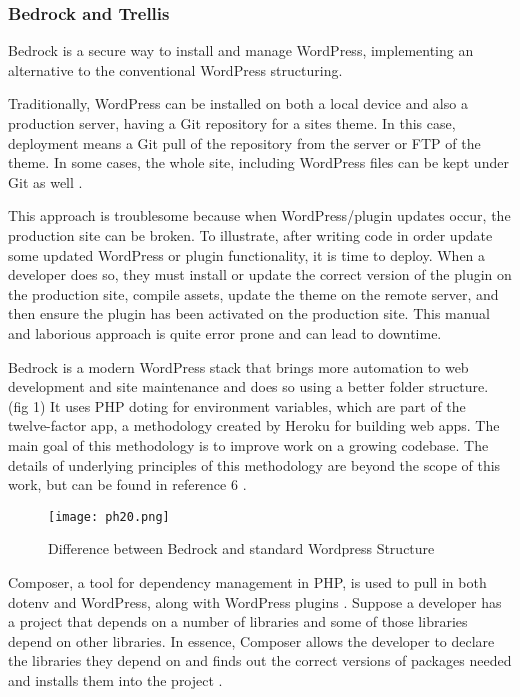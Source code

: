 \hypertarget{bedrock-and-trellis}{%
\subsubsection{Bedrock and Trellis}\label{bedrock-and-trellis}}

Bedrock is a secure way to install and manage WordPress, implementing an
alternative to the conventional WordPress structuring.

Traditionally, WordPress can be installed on both a local device and
also a production server, having a Git repository for a sites theme. In
this case, deployment means a Git pull of the repository from the server
or FTP of the theme. In some cases, the whole site, including WordPress
files can be kept under Git as well \cite{p6} .

This approach is troublesome because when WordPress/plugin updates
occur, the production site can be broken. To illustrate, after writing
code in order update some updated WordPress or plugin functionality, it
is time to deploy. When a developer does so, they must install or update
the correct version of the plugin on the production site, compile
assets, update the theme on the remote server, and then ensure the
plugin has been activated on the production site. This manual and
laborious approach is quite error prone and can lead to downtime.

Bedrock is a modern WordPress stack that brings more automation to web
development and site maintenance and does so using a better folder
structure. (fig 1) It uses PHP doting for environment variables, which
are part of the twelve-factor app, a methodology created by Heroku for
building web apps\cite{p5}. The main goal of this methodology is to
improve work on a growing codebase. The details of underlying principles
of this methodology are beyond the scope of this work, but can be found
in reference 6 \cite{p8} .

\begin{figure}[H]
      \centering
      \texttt{[image: ph20.png]}
      \caption{Difference between Bedrock and standard Wordpress Structure}
 \end{figure}

Composer, a tool for dependency management in PHP, is used to pull in
both dotenv and WordPress, along with WordPress plugins \cite{p7} .
Suppose a developer has a project that depends on a number of libraries
and some of those libraries depend on other libraries. In essence,
Composer allows the developer to declare the libraries they depend on
and finds out the correct versions of packages needed and installs them
into the project \cite{p8} .

